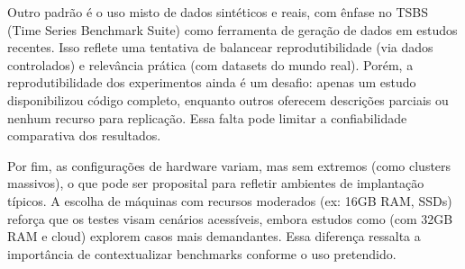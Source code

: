Outro padrão é o uso misto de dados sintéticos e reais, com ênfase no TSBS (Time Series Benchmark Suite) como ferramenta de geração de dados em estudos recentes. Isso reflete uma tentativa de balancear reprodutibilidade (via dados controlados) e relevância prática (com datasets do mundo real). Porém, a reprodutibilidade dos experimentos ainda é um desafio: apenas um estudo disponibilizou código completo, enquanto outros oferecem descrições parciais ou nenhum recurso para replicação. Essa falta pode limitar a confiabilidade comparativa dos resultados.

Por fim, as configurações de hardware variam, mas sem extremos (como clusters massivos), o que pode ser proposital para refletir ambientes de implantação típicos. A escolha de máquinas com recursos moderados (ex: 16GB RAM, SSDs) reforça que os testes visam cenários acessíveis, embora estudos como  (com 32GB RAM e cloud) explorem casos mais demandantes. Essa diferença ressalta a importância de contextualizar benchmarks conforme o uso pretendido.